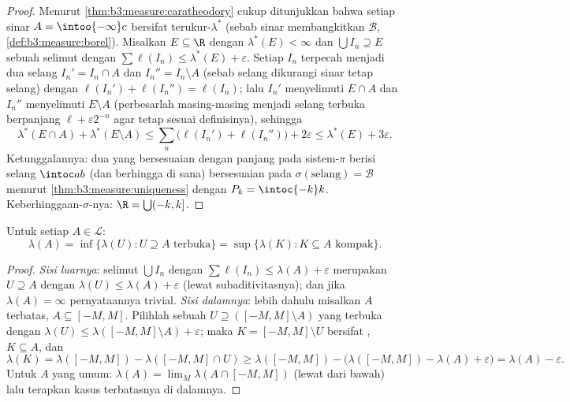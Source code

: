 \begin{proof}
Menurut \cref{thm:b3:measure:caratheodory} cukup ditunjukkan bahwa setiap
sinar $A = \intoo{-\infty}c$ bersifat terukur-$\lambda^*$
(sebab sinar membangkitkan $\mathcal B$,
\cref{def:b3:measure:borel}). Misalkan $E \subseteq \R$ dengan
$\lambda^*(E) < \infty$ dan $\bigcup I_n \supseteq E$ sebuah selimut
dengan $\sum\ell(I_n) \leq \lambda^*(E) + \varepsilon$. Setiap
$I_n$ terpecah menjadi dua selang $I_n' = I_n \cap A$ dan
$I_n'' = I_n\setminus A$ (sebab selang dikurangi sinar tetap
selang) dengan $\ell(I_n') + \ell(I_n'') = \ell(I_n)$; lalu
$I_n'$ menyelimuti $E \cap A$ dan $I_n''$ menyelimuti $E \setminus A$
(perbesarlah masing-masing menjadi selang terbuka berpanjang $\ell +
\varepsilon2^{-n}$ agar tetap sesuai definisinya), sehingga
\[
\lambda^*(E\cap A) + \lambda^*(E\setminus A)
\leq \sum_n\bigl(\ell(I_n') + \ell(I_n'')\bigr) + 2\varepsilon
\leq \lambda^*(E) + 3\varepsilon .
\]
Ketunggalannya: dua  yang bersesuaian dengan panjang pada
sistem-$\pi$ berisi selang $\intoc ab$ (dan berhingga di sana) bersesuaian pada
$\sigma(\text{selang}) = \mathcal B$ menurut
\cref{thm:b3:measure:uniqueness} dengan $P_k = \intoc{-k}k$.
Keberhinggaan-$\sigma$-nya: $\R = \bigcup(-k, k]$.
\end{proof}

\begin{theorem}[Keteraturan]\label{thm:b3:measure:regularity}
Untuk setiap $A \in \mathcal L$:
\[
\lambda(A) = \inf\{\lambda(U) : U \supseteq A \text{ terbuka}\}
= \sup\{\lambda(K) : K \subseteq A \text{ kompak}\}.
\]
\end{theorem}

\begin{proof}
\emph{Sisi luarnya}: selimut $\bigcup I_n$ dengan $\sum\ell(I_n) \leq
\lambda(A) + \varepsilon$ merupakan  $U \supseteq A$ dengan
$\lambda(U) \leq \lambda(A) + \varepsilon$ (lewat subaditivitasnya); dan jika
$\lambda(A) = \infty$ pernyataannya trivial. \emph{Sisi dalamnya}:
lebih dahulu misalkan $A$ terbatas, $A \subseteq [-M, M]$. Pilihlah sebuah
$U \supseteq ([-M,M]\setminus A)$ yang terbuka dengan $\lambda(U) \leq
\lambda([-M,M]\setminus A) + \varepsilon$; maka $K = [-M,
M]\setminus U$ bersifat , $K \subseteq A$, dan
\[
\lambda(K) = \lambda([-M,M]) - \lambda([-M,M]\cap U)
\geq \lambda([-M,M]) - \bigl(\lambda([-M,M]) - \lambda(A) +
\varepsilon\bigr) = \lambda(A) - \varepsilon .
\]
Untuk $A$ yang umum: $\lambda(A) = \lim_M\lambda(A\cap[-M,M])$
(lewat  dari bawah) lalu terapkan kasus terbatasnya di dalamnya.
\end{proof}

